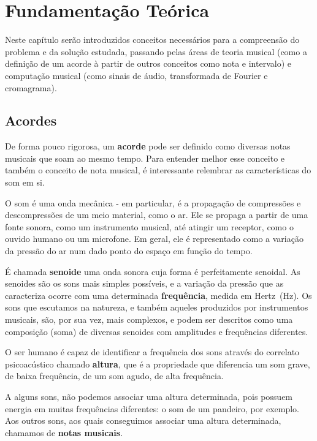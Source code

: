 \chapter{Fundamentação Teórica}
\label{cap:fundamentacao}

Neste capítulo serão introduzidos conceitos necessários para a compreensão do problema e da solução estudada, passando pelas áreas de teoria musical (como a definição de um acorde à partir de outros conceitos como nota e intervalo) e computação musical (como sinais de áudio, transformada de Fourier e cromagrama).

\section{Acordes}
    De forma pouco rigorosa, um \textbf{acorde} pode ser definido como diversas notas musicais que soam ao mesmo tempo. Para entender melhor esse conceito e também o conceito de nota musical, é interessante relembrar as características do som em si.
    
    O som é uma onda mecânica - em particular, é a propagação de compressões e descompressões de um meio material, como o ar. Ele se propaga a partir de uma fonte sonora, como um instrumento musical, até atingir um receptor, como o ouvido humano ou um microfone. Em geral, ele é representado como a variação da pressão do ar num dado ponto do espaço em função do tempo.

    É chamada \textbf{senoide} uma onda sonora cuja forma é perfeitamente senoidal. As senoides são os sons mais simples possíveis, e a variação da pressão que as caracteriza ocorre com uma determinada \textbf{frequência}, medida em Hertz~(Hz). Os sons que escutamos na natureza, e também aqueles produzidos por instrumentos musicais, são, por sua vez, mais complexos, e podem ser descritos como uma composição (soma) de diversas senoides com amplitudes e frequências diferentes.

    O ser humano é capaz de identificar a frequência dos sons através do correlato psicoacústico chamado \textbf{altura}, que é a propriedade que diferencia um som grave, de baixa frequência, de um som agudo, de alta frequência.

    A alguns sons, não podemos associar uma altura determinada, pois possuem energia em muitas frequências diferentes: o som de um pandeiro, por exemplo. Aos outros sons, aos quais conseguimos associar uma altura determinada, chamamos de \textbf{notas musicais}.
    
